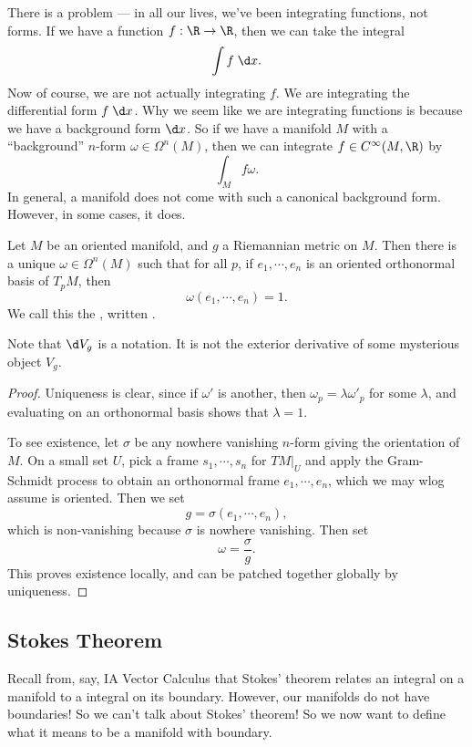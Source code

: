 \documentclass[a4paper]{article}
\begin{document}
There is a problem --- in all our lives, we've been integrating functions, not forms. If we have a function $f: \R \to \R$, then we can take the integral
\[
  \int f\;\d x.
\]
Now of course, we are not actually integrating $f$. We are integrating the differential form $f\;\d x$. Why we seem like we are integrating functions is because we have a background form $\d x$. So if we have a manifold $M$ with a ``background'' $n$-form $\omega \in \Omega^n (M)$, then we can integrate $f \in C^\infty(M, \R)$ by
\[
  \int_M f \omega.
\]
In general, a manifold does not come with such a canonical background form. However, in some cases, it does.
\begin{lemma}
  Let $M$ be an oriented manifold, and $g$ a Riemannian metric on $M$. Then there is a unique $\omega \in \Omega^n(M)$ such that for all $p$, if $e_1, \cdots, e_n$ is an oriented orthonormal basis of $T_pM$, then
  \[
    \omega(e_1, \cdots, e_n) = 1.
  \]
  We call this the , written .
\end{lemma}
Note that $\d V_g$ is a notation. It is not the exterior derivative of some mysterious object $V_g$.

\begin{proof}
  Uniqueness is clear, since if $\omega'$ is another, then $\omega_p = \lambda \omega'_p$ for some $\lambda$, and evaluating on an orthonormal basis shows that $\lambda = 1$.

  To see existence, let $\sigma$ be any nowhere vanishing $n$-form giving the orientation of $M$. On a small set $U$, pick a frame $s_1, \cdots, s_n$ for $TM|_U$ and apply the Gram-Schmidt process to obtain an orthonormal frame $e_1, \cdots, e_n$, which we may wlog assume is oriented. Then we set
  \[
    g = \sigma(e_1, \cdots, e_n),
  \]
  which is non-vanishing because $\sigma$ is nowhere vanishing. Then set
  \[
    \omega = \frac{\sigma}{g}.
  \]
  This proves existence locally, and can be patched together globally by uniqueness.
\end{proof}
\subsection{Stokes Theorem}
Recall from, say, IA Vector Calculus that Stokes' theorem relates an integral on a manifold to a integral on its boundary. However, our manifolds do not have boundaries! So we can't talk about Stokes' theorem! So we now want to define what it means to be a manifold with boundary.
\end{document}
